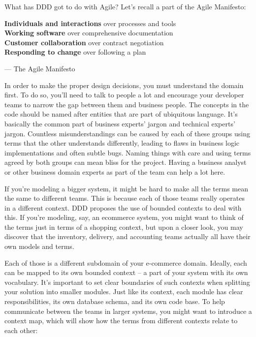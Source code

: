 What has DDD got to do with Agile? Let's recall a part of the Agile Manifesto:


\noindent
\hspace*{0.8cm}\textbf{Individuals and interactions} over processes and tools \\
\hspace*{0.8cm}\textbf{Working software} over comprehensive documentation \\
\hspace*{0.8cm}\textbf{Customer collaboration} over contract negotiation \\
\hspace*{0.8cm}\textbf{Responding to change} over following a plan

\noindent
\hspace*{0.8cm}— The Agile Manifesto


In order to make the proper design decisions, you must understand the domain first. To do so, you'll need to talk to people a lot and encourage your developer teams to narrow the gap between them and business people. The concepts in the code should be named after entities that are part of ubiquitous language. It's basically the common part of business experts' jargon and technical experts' jargon. Countless misunderstandings can be caused by each of these groups using terms that the other understands differently, leading to flaws in business logic implementations and often subtle bugs. Naming things with care and using terms agreed by both groups can mean bliss for the project. Having a business analyst or other business domain experts as part of the team can help a lot here.

If you're modeling a bigger system, it might be hard to make all the terms mean the same to different teams. This is because each of those teams really operates in a different context. DDD proposes the use of bounded contexts to deal with this. If you're modeling, say, an ecommerce system, you might want to think of the terms just in terms of a shopping context, but upon a closer look, you may discover that the inventory, delivery, and accounting teams actually all have their own models and terms.

Each of those is a different subdomain of your e-commerce domain. Ideally, each can be mapped to its own bounded context – a part of your system with its own vocabulary. It's important to set clear boundaries of such contexts when splitting your solution into smaller modules. Just like its context, each module has clear responsibilities, its own database schema, and its own code base. To help communicate between the teams in larger systems, you might want to introduce a context map, which will show how the terms from different contexts relate to each other:


